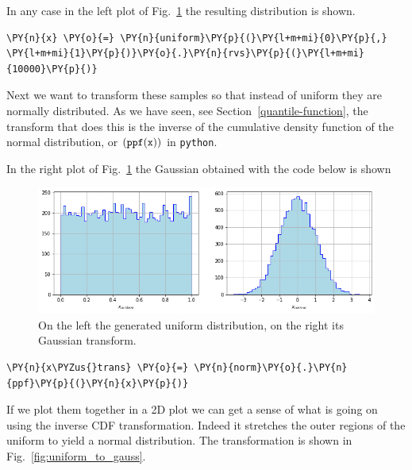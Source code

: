 In any case in the left plot of Fig.~\ref{fig:uniform_and_gauss} the resulting distribution is shown.

\begin{tcolorbox}[breakable, size=fbox, boxrule=1pt, pad at break*=1mm,colback=cellbackground, colframe=cellborder]
\begin{Verbatim}[commandchars=\\\{\}]
\PY{n}{x} \PY{o}{=} \PY{n}{uniform}\PY{p}{(}\PY{l+m+mi}{0}\PY{p}{,} \PY{l+m+mi}{1}\PY{p}{)}\PY{o}{.}\PY{n}{rvs}\PY{p}{(}\PY{l+m+mi}{10000}\PY{p}{)}
\end{Verbatim}
\end{tcolorbox}

Next we want to transform these samples so that instead of uniform they
are normally distributed. As we have seen, see Section~\ref{quantile-function}, the transform that does this
is the inverse of the cumulative density function of the normal 
distribution, or \((\tt{ppf(x))}\) in \texttt{python}. 

In the right plot of Fig.~\ref{fig:uniform_and_gauss} the Gaussian obtained 
with the code below is shown

\begin{figure}[h]
  \centering
  \includegraphics[width=1.\textwidth]{figures/uniform_gauss.png}
  \caption{On the left the generated uniform distribution, on the right its Gaussian transform.}
  \label{fig:uniform_and_gauss}
\end{figure}

\begin{tcolorbox}[breakable, size=fbox, boxrule=1pt, pad at break*=1mm,colback=cellbackground, colframe=cellborder]
\begin{Verbatim}[commandchars=\\\{\}]
\PY{n}{x\PYZus{}trans} \PY{o}{=} \PY{n}{norm}\PY{o}{.}\PY{n}{ppf}\PY{p}{(}\PY{n}{x}\PY{p}{)}
\end{Verbatim}
\end{tcolorbox}

If we plot them together in a 2D plot we can get a sense of what is
going on using the inverse CDF transformation.
Indeed it stretches the outer regions of the uniform to yield a
normal distribution. The transformation is shown in Fig.~\ref{fig:uniform_to_gauss}. 
    
